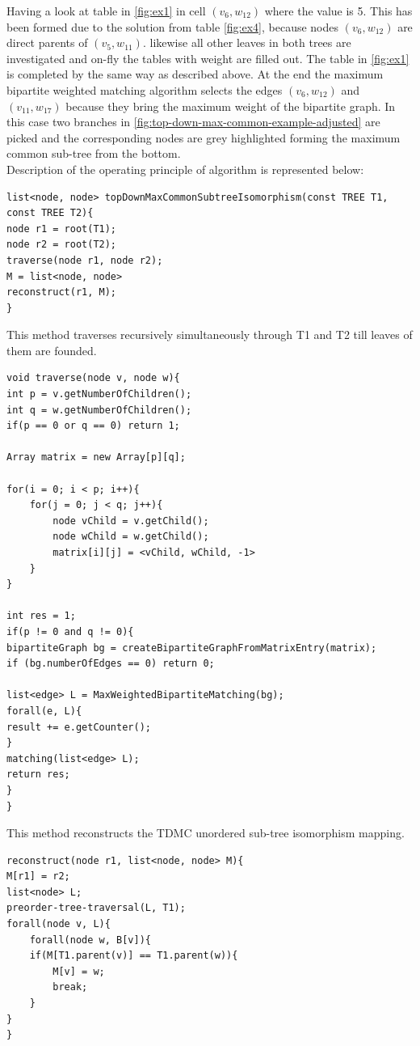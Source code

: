 \documentclass{report}
\begin{document}
Having a look at table in \ref{fig:ex1} in cell $(v_{6},w_{12})$ where the value is 5. This has been formed due to the solution from table \ref{fig:ex4}, because nodes $(v_{6},w_{12})$ are direct parents of $(v_{5},w_{11})$. likewise all other leaves in both trees are investigated and on-fly the tables with weight are filled out. The table in \ref{fig:ex1} is completed by the same way as described above. At the end the maximum bipartite weighted matching algorithm selects the edges $(v_{6},w_{12})$ and $(v_{11},w_{17})$ because they bring the maximum weight of the bipartite graph. In this case two branches in \ref{fig:top-down-max-common-example-adjusted} are picked and the corresponding nodes are grey highlighted forming the maximum common sub-tree from the bottom.\\
Description of the operating principle of algorithm is represented  below:

\begin{lstlisting}
list<node, node> topDownMaxCommonSubtreeIsomorphism(const TREE T1, const TREE T2){
node r1 = root(T1);
node r2 = root(T2);
traverse(node r1, node r2);
M = list<node, node>
reconstruct(r1, M);
}
\end{lstlisting}

This method traverses recursively simultaneously through T1 and T2 till leaves of them are founded.
\begin{lstlisting}
void traverse(node v, node w){
int p = v.getNumberOfChildren();
int q = w.getNumberOfChildren();
if(p == 0 or q == 0) return 1;

Array matrix = new Array[p][q];

for(i = 0; i < p; i++){
	for(j = 0; j < q; j++){
		node vChild = v.getChild();	
		node wChild = w.getChild();
		matrix[i][j] = <vChild, wChild, -1>
	}
}

int res = 1;
if(p != 0 and q != 0){
bipartiteGraph bg = createBipartiteGraphFromMatrixEntry(matrix);
if (bg.numberOfEdges == 0) return 0;

list<edge> L = MaxWeightedBipartiteMatching(bg);
forall(e, L){
result += e.getCounter();
}
matching(list<edge> L);
return res;
}
}
\end{lstlisting}
This method reconstructs the TDMC unordered sub-tree isomorphism mapping.
\begin{lstlisting}
reconstruct(node r1, list<node, node> M){
M[r1] = r2;
list<node> L;
preorder-tree-traversal(L, T1);
forall(node v, L){
	forall(node w, B[v]){
	if(M[T1.parent(v)] == T1.parent(w)){
		M[v] = w;
		break;	
	}
}
}
\end{lstlisting}
\end{document}
